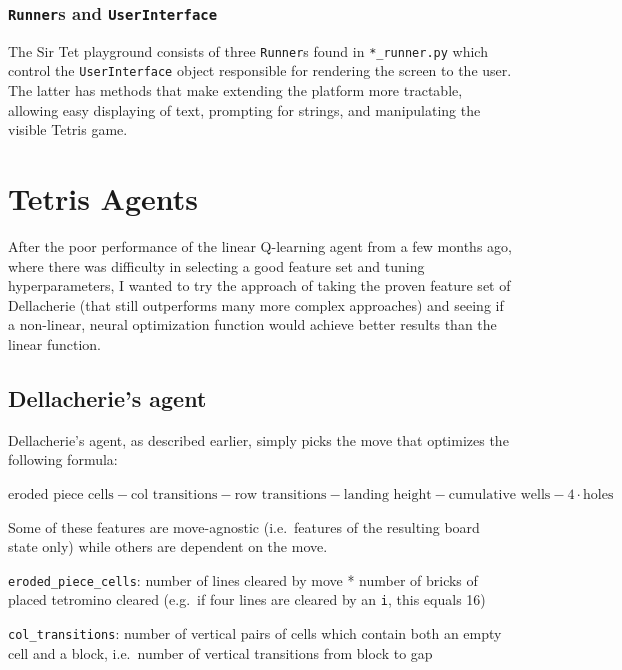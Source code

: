 \documentclass[11pt]{article}
\begin{document}
\hypertarget{runners-and-userinterface}{%
\subsubsection{\texorpdfstring{\texttt{Runner}s and
\texttt{UserInterface}}{Runners and UserInterface}}\label{runners-and-userinterface}}

The Sir Tet playground consists of three \texttt{Runner}s found in
\texttt{*\_runner.py} which control the \texttt{UserInterface} object
responsible for rendering the screen to the user. The latter has methods
that make extending the platform more tractable, allowing easy
displaying of text, prompting for strings, and manipulating the visible
Tetris game.

    \hypertarget{tetris-agents}{%
\section{Tetris Agents}\label{tetris-agents}}

After the poor performance of the linear Q-learning agent from a few
months ago, where there was difficulty in selecting a good feature set
and tuning hyperparameters, I wanted to try the approach of taking the
proven feature set of Dellacherie (that still outperforms many more
complex approaches) and seeing if a non-linear, neural optimization
function would achieve better results than the linear function.

\hypertarget{dellacheries-agent}{%
\subsection{Dellacherie's agent}\label{dellacheries-agent}}

Dellacherie's agent, as described earlier, simply picks the move that
optimizes the following formula:

    \(\text{eroded piece cells} - \text{col transitions} - \text{row transitions} - \text{landing height} - \text{cumulative wells} - 4\cdot\text{holes}\)

    Some of these features are move-agnostic (i.e.~features of the resulting
board state only) while others are dependent on the move.

\texttt{eroded\_piece\_cells}: number of lines cleared by move * number
of bricks of placed tetromino cleared (e.g.~if four lines are cleared by
an \texttt{i}, this equals 16)

\texttt{col\_transitions}: number of vertical pairs of cells which
contain both an empty cell and a block, i.e.~number of vertical
transitions from block to gap
\end{document}
